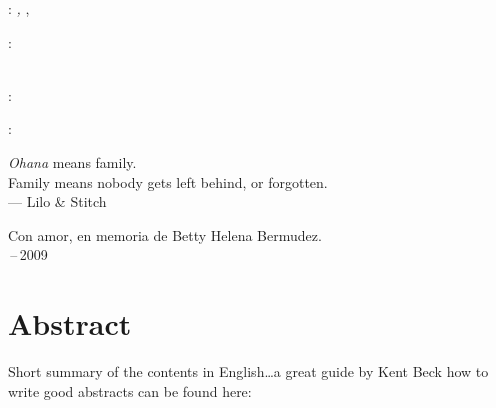 \thispagestyle{empty}

\hfill

\vfill

\noindent\myName: \textit{\myTitle,} \mySubtitle, %
\textcopyright\ \myTime

\bigskip
%
\noindent{}: \\
\myProf \\
\myOtherProf %
%
\medskip

\noindent{}: \\
\myLocation

\medskip

\noindent{}: \\
\myTime

\cleardoublepage

\thispagestyle{empty}
{}

\vspace*{3cm}

\begin{center}
    \emph{Ohana} means family. \\
    Family means nobody gets left behind, or forgotten. \\ \medskip
    --- Lilo \& Stitch
\end{center}

\medskip

\begin{center}
    Con amor, en memoria de Betty Helena Bermudez. \\ \,--\,2009
\end{center}


\cleardoublepage

\begingroup
\let\clearpage\relax
\let\cleardoublepage\relax
\let\cleardoublepage\relax

\chapter*{Abstract}
Short summary of the contents in English\dots a great guide by
Kent Beck how to write good abstracts can be found here:


